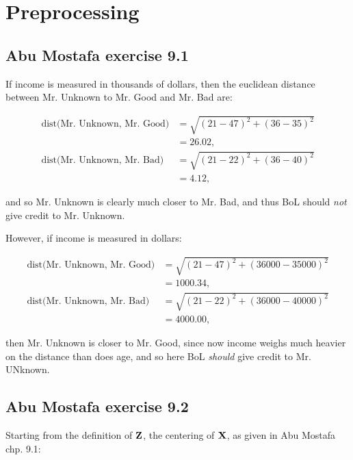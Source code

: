 \section{Preprocessing}

\subsection{Abu Mostafa exercise 9.1}

If income is measured in thousands of dollars, then the euclidean distance
between Mr. Unknown to Mr. Good and Mr. Bad are:

\begin{align*}
  \text{dist(Mr. Unknown, Mr. Good)} &= \sqrt{(21 - 47)^2 + (36 - 35)^2}\\
                                     &= 26.02,\\[4pt]
  \text{dist(Mr. Unknown, Mr. Bad)} &= \sqrt{(21 - 22)^2 + (36 - 40)^2}\\
                                    &= 4.12,
\end{align*}

and so Mr. Unknown is clearly much closer to Mr. Bad, and thus BoL should
\textit{not} give credit to Mr. Unknown.

However, if income is measured in dollars:

\begin{align*}
  \text{dist(Mr. Unknown, Mr. Good)} &= \sqrt{(21 - 47)^2 + (36000 - 35000)^2}\\
                                     &= 1000.34,\\[4pt]
  \text{dist(Mr. Unknown, Mr. Bad)} &= \sqrt{(21 - 22)^2 + (36000 - 40000)^2}\\
                                    &= 4000.00,
\end{align*}

then Mr. Unknown is closer to Mr. Good, since now income weighs much heavier on
the distance than does age, and so here BoL \textit{should} give credit to Mr.
UNknown. 

\subsection{Abu Mostafa exercise 9.2}

\newcommand{\one}{\mbf{1}_n}
\newcommand{\id}{\mbf{I}_n}

Starting from the definition of $\mathbf{Z}$, the centering of $\mathbf{X}$, as given in
Abu Mostafa chp. 9.1:


